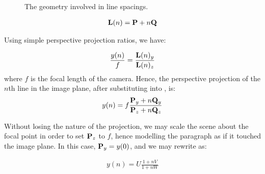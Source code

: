 \begin{figure}[t]
\centering
\begin{center}
\caption{The geometry involved in line spacings.}
\label{zyspacings}
\end{center}
\end{figure}

\begin{eqnarray}
{ \bf L }(n) = { \bf P }+n{ \bf Q } \label{nthline}
\end{eqnarray}

{\parindent 0mm
Using simple perspective projection ratios, we have: 
}

\begin{eqnarray}
\frac{y(n)}{f}  = \frac{ { \bf L }(n)_y }{ { \bf L }(n)_z }  \label{spacingspq1}
\end{eqnarray}
{\parindent 0mm
where $f$ is the focal length of the camera. Hence, the perspective projection
of the  $n$th line in the image plane, after substituting  into
, is: 
}
\begin{eqnarray}
y(n) =  f \frac{ { \bf P }_y + n { \bf Q }_y }{ { \bf P }_z + n{ \bf Q }_z } \label{spacingspq}
\end{eqnarray}

{\parindent 0mm
Without losing the nature of the projection, we may scale the scene about the focal point in order to set ${ \bf P }_z$ to $f$, hence modelling the paragraph as if it touched the image plane.  In this case, ${ \bf P }_y=y(0)$,
and we may rewrite  as:
}

\begin{eqnarray}
y(n) = U \frac{ 1 + nV }{ 1 + nW } \label{spacingsvweqn}
\end{eqnarray}

